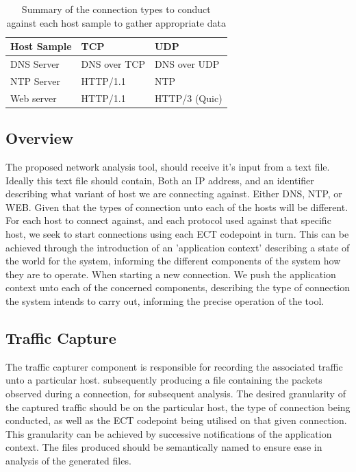\documentclass{l4proj}
\begin{document}
\begin{table}[]
\centering
\begin{tabular}{|l|l|l|}
\hline
\textbf{Host Sample} & \textbf{TCP}          & \textbf{UDP}           \\ \hline
DNS Server  & DNS over TCP & DNS over UDP  \\ \hline
NTP Server  & HTTP/1.1     & NTP           \\ \hline
Web server  & HTTP/1.1     & HTTP/3 (Quic) \\ \hline
\end{tabular}
\caption{Summary of the connection types to conduct against each host sample to gather appropriate data}
\label{table:proto}
\end{table}

\subsection{Overview}

The proposed network analysis tool, should receive it's input from a text file. Ideally this text file should contain, Both an IP address, and an identifier describing what variant of host we are connecting against. Either DNS, NTP, or WEB. Given that the types of connection unto each of the hosts will be different. For each host to connect against, and each protocol used against that specific host, we seek to start connections using each ECT codepoint in turn. This can be achieved through the introduction of an 'application context' describing a state of the world for the system, informing the different components of the system how they are to operate. When starting a new connection. We push the application context unto each of the concerned components, describing the type of connection the system intends to carry out, informing the precise operation of the tool.

\subsection{Traffic Capture}

The traffic capturer component is responsible for recording the associated traffic unto a particular host. subsequently producing a file containing the packets observed during a connection, for subsequent analysis. The desired granularity of the captured traffic should be on the particular host, the type of connection being conducted, as well as the ECT codepoint being utilised on that given connection. This granularity can be achieved by successive notifications of the application context. The files produced should be semantically named to ensure ease in analysis of the generated files.
\end{document}
